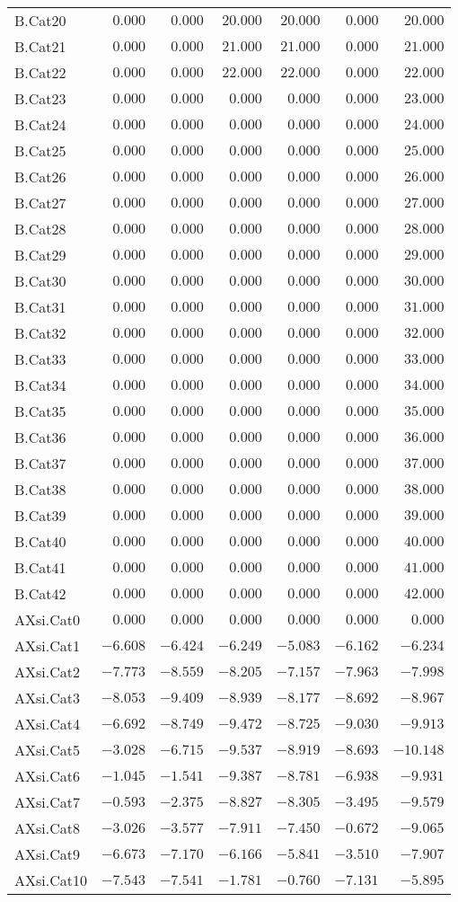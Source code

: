 {\begin{longtable}{lrrrrrr}
B.Cat20&$ 0.000$&$ 0.000$&$20.000$&$20.000$&$ 0.000$&$ 20.000$\tabularnewline
B.Cat21&$ 0.000$&$ 0.000$&$21.000$&$21.000$&$ 0.000$&$ 21.000$\tabularnewline
B.Cat22&$ 0.000$&$ 0.000$&$22.000$&$22.000$&$ 0.000$&$ 22.000$\tabularnewline
B.Cat23&$ 0.000$&$ 0.000$&$ 0.000$&$ 0.000$&$ 0.000$&$ 23.000$\tabularnewline
B.Cat24&$ 0.000$&$ 0.000$&$ 0.000$&$ 0.000$&$ 0.000$&$ 24.000$\tabularnewline
B.Cat25&$ 0.000$&$ 0.000$&$ 0.000$&$ 0.000$&$ 0.000$&$ 25.000$\tabularnewline
B.Cat26&$ 0.000$&$ 0.000$&$ 0.000$&$ 0.000$&$ 0.000$&$ 26.000$\tabularnewline
B.Cat27&$ 0.000$&$ 0.000$&$ 0.000$&$ 0.000$&$ 0.000$&$ 27.000$\tabularnewline
B.Cat28&$ 0.000$&$ 0.000$&$ 0.000$&$ 0.000$&$ 0.000$&$ 28.000$\tabularnewline
B.Cat29&$ 0.000$&$ 0.000$&$ 0.000$&$ 0.000$&$ 0.000$&$ 29.000$\tabularnewline
B.Cat30&$ 0.000$&$ 0.000$&$ 0.000$&$ 0.000$&$ 0.000$&$ 30.000$\tabularnewline
B.Cat31&$ 0.000$&$ 0.000$&$ 0.000$&$ 0.000$&$ 0.000$&$ 31.000$\tabularnewline
B.Cat32&$ 0.000$&$ 0.000$&$ 0.000$&$ 0.000$&$ 0.000$&$ 32.000$\tabularnewline
B.Cat33&$ 0.000$&$ 0.000$&$ 0.000$&$ 0.000$&$ 0.000$&$ 33.000$\tabularnewline
B.Cat34&$ 0.000$&$ 0.000$&$ 0.000$&$ 0.000$&$ 0.000$&$ 34.000$\tabularnewline
B.Cat35&$ 0.000$&$ 0.000$&$ 0.000$&$ 0.000$&$ 0.000$&$ 35.000$\tabularnewline
B.Cat36&$ 0.000$&$ 0.000$&$ 0.000$&$ 0.000$&$ 0.000$&$ 36.000$\tabularnewline
B.Cat37&$ 0.000$&$ 0.000$&$ 0.000$&$ 0.000$&$ 0.000$&$ 37.000$\tabularnewline
B.Cat38&$ 0.000$&$ 0.000$&$ 0.000$&$ 0.000$&$ 0.000$&$ 38.000$\tabularnewline
B.Cat39&$ 0.000$&$ 0.000$&$ 0.000$&$ 0.000$&$ 0.000$&$ 39.000$\tabularnewline
B.Cat40&$ 0.000$&$ 0.000$&$ 0.000$&$ 0.000$&$ 0.000$&$ 40.000$\tabularnewline
B.Cat41&$ 0.000$&$ 0.000$&$ 0.000$&$ 0.000$&$ 0.000$&$ 41.000$\tabularnewline
B.Cat42&$ 0.000$&$ 0.000$&$ 0.000$&$ 0.000$&$ 0.000$&$ 42.000$\tabularnewline
AXsi.Cat0&$ 0.000$&$ 0.000$&$ 0.000$&$ 0.000$&$ 0.000$&$  0.000$\tabularnewline
AXsi.Cat1&$-6.608$&$-6.424$&$-6.249$&$-5.083$&$-6.162$&$ -6.234$\tabularnewline
AXsi.Cat2&$-7.773$&$-8.559$&$-8.205$&$-7.157$&$-7.963$&$ -7.998$\tabularnewline
AXsi.Cat3&$-8.053$&$-9.409$&$-8.939$&$-8.177$&$-8.692$&$ -8.967$\tabularnewline
AXsi.Cat4&$-6.692$&$-8.749$&$-9.472$&$-8.725$&$-9.030$&$ -9.913$\tabularnewline
AXsi.Cat5&$-3.028$&$-6.715$&$-9.537$&$-8.919$&$-8.693$&$-10.148$\tabularnewline
AXsi.Cat6&$-1.045$&$-1.541$&$-9.387$&$-8.781$&$-6.938$&$ -9.931$\tabularnewline
AXsi.Cat7&$-0.593$&$-2.375$&$-8.827$&$-8.305$&$-3.495$&$ -9.579$\tabularnewline
AXsi.Cat8&$-3.026$&$-3.577$&$-7.911$&$-7.450$&$-0.672$&$ -9.065$\tabularnewline
AXsi.Cat9&$-6.673$&$-7.170$&$-6.166$&$-5.841$&$-3.510$&$ -7.907$\tabularnewline
AXsi.Cat10&$-7.543$&$-7.541$&$-1.781$&$-0.760$&$-7.131$&$ -5.895$\tabularnewline

\end{longtable}}
